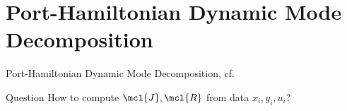 \section{Port-Hamiltonian Dynamic Mode Decomposition}

\begin{frame}{Port-Hamiltonian Dynamic Mode Decomposition, cf.~\cite{Morandin2022}}
    \begin{alertblock}{Question}
        How to compute $\mcl{J}, \mcl{R}$ from data $x_i, y_i, u_i$?
    \end{alertblock}



\end{frame}

